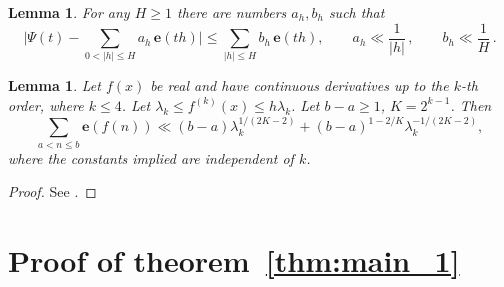\documentclass[12pt, reqno, twoside, letterpaper]{amsart}
\numberwithin{equation}{section}
\newcommand{\e}{\ensuremath{\mathbf{e}}}
\theoremstyle{customthm}
\newtheorem{lemma}[X]{Lemma}
\theoremstyle{customrem}
\renewcommand{\le}{\ensuremath{\leqslant}}
\renewcommand{\ge}{\ensuremath{\geqslant}}
\begin{document}
\begin{lemma}
	\label{lem:Vaaler}
	For any $H\ge 1$ there are numbers $a_h,b_h$ such that
	$$
	\bigg|\Psi(t)-\sum_{0<|h|\le H}a_h\,\e(th)\bigg|
	\le\sum_{|h|\le H}b_h\,\e(th),\qquad
	a_h\ll\frac{1}{|h|}\,,\qquad b_h\ll\frac{1}{H}\,.
	$$
\end{lemma}

\begin{lemma}
	\label{exponential_sum}
Let $f(x)$ be real and have continuous derivatives up to the $k$-th order, where $k\leqslant 4$. Let $\lambda_k\leqslant f^{(k)}(x)\leqslant h\lambda_k$. Let $b-a\geqslant 1$, $K=2^{k-1}$. Then
$$
\sum_{a<n\leqslant b}\e(f(n))\ll (b-a)\lambda_k^{1/(2K-2)}+(b-a)^{1-2/K}\lambda_k^{-1/(2K-2)},
$$
where the constants implied are independent of $k$.
\end{lemma}
\begin{proof}
See \cite[Theorem~5.13]{Titc}.
\end{proof}



\section{Proof of theorem~\ref{thm:main_1}}
\end{document}

